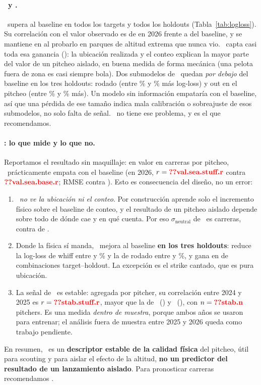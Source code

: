 \documentclass[10pt]{article}
\begin{document}
\paragraph{\pplus\ y \lplus.} \pplus\ supera al baseline en todos los targets y todos los holdouts (Tabla~\ref{tab:logloss}). Su correlación con el valor observado es de  en 2026 frente a  del baseline, y se mantiene en  al probarlo en parques de altitud extrema que nunca vio. \lplus\ capta casi toda esa ganancia (): la ubicación realizada y el conteo explican la mayor parte del valor de un pitcheo aislado, en buena medida de forma mecánica (una pelota fuera de zona es casi siempre bola). Dos submodelos de \lplus\ quedan \emph{por debajo} del baseline en los tres holdouts: rodado (entre \% y \% más log-loss) y out en el pitcheo (entre \% y \% más). Un modelo sin información empataría con el baseline, así que una pérdida de ese tamaño indica mala calibración o sobreajuste de esos submodelos, no solo falta de señal. \pplus\ no tiene ese problema, y es el que recomendamos.

\paragraph{\splus: lo que mide y lo que no.} Reportamos el resultado sin maquillaje: en valor en carreras por pitcheo, \splus\ prácticamente empata con el baseline (en 2026, $r=\cf{val.sea.stuff.r}$ contra $\cf{val.sea.base.r}$; RMSE  contra ). Esto es consecuencia del diseño, no un error:
\begin{enumerate}
  \item \splus\ \emph{no ve la ubicación ni el conteo}. Por construcción aprende solo el incremento físico sobre el baseline de conteo, y el resultado de un pitcheo aislado depende sobre todo de dónde cae y en qué cuenta. Por eso $\sigma_{\text{neutral}}$ de \splus\ es  carreras, contra  de \pplus.
  \item Donde la física sí manda, \splus\ mejora al baseline \textbf{en los tres holdouts}: reduce la log-loss de whiff entre  y \% y la de rodado entre  y \%, y gana en  de  combinaciones target--holdout. La excepción es el strike cantado, que es pura ubicación.
  \item La señal de \splus\ es estable: agregada por pitcher, su correlación entre 2024 y 2025 es $r=\cf{stab.stuff.r}$, mayor que la de \lplus\ () y \pplus\ (), con $n=\cf{stab.n}$ pitchers. Es una medida \emph{dentro de muestra}, porque ambos años se usaron para entrenar; el análisis fuera de muestra entre 2025 y 2026 queda como trabajo pendiente.
\end{enumerate}
En resumen, \splus\ es un \textbf{descriptor estable de la calidad física} del pitcheo, útil para scouting y para aislar el efecto de la altitud, \textbf{no un predictor del resultado de un lanzamiento aislado}. Para pronosticar carreras recomendamos \pplus.
\end{document}
